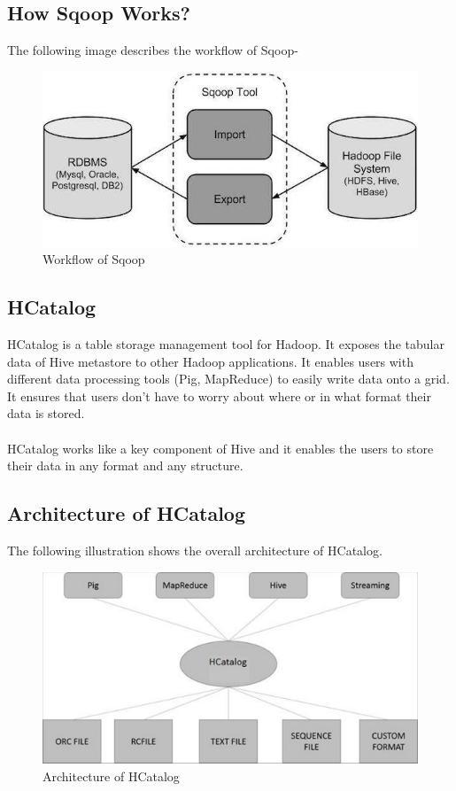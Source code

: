 \begin{itemize}
\subsection*{How Sqoop Works?}
The following image describes the workflow of Sqoop-
\begin{figure}[h!]
	\centering
	\includegraphics[width=\linewidth]{sqoop_work.jpg}
	\caption{Workflow of Sqoop}
\end{figure}
\subsection{HCatalog}
HCatalog is a table storage management tool for Hadoop. It exposes the tabular data of Hive metastore to other Hadoop applications. It enables users with different data processing tools (Pig, MapReduce) to easily write data onto a grid. It ensures that users don’t have to worry about where or in what format their data is stored.
\\
\\
HCatalog works like a key component of Hive and it enables the users to store their data in any format and any structure.
\subsection*{Architecture of HCatalog}
The following illustration shows the overall architecture of HCatalog.
\begin{figure}[h!]
\centering
\includegraphics[width=\linewidth]{Hcatalog_architecture.jpg}
\caption{Architecture of HCatalog}
\end{figure}

\end{itemize}
